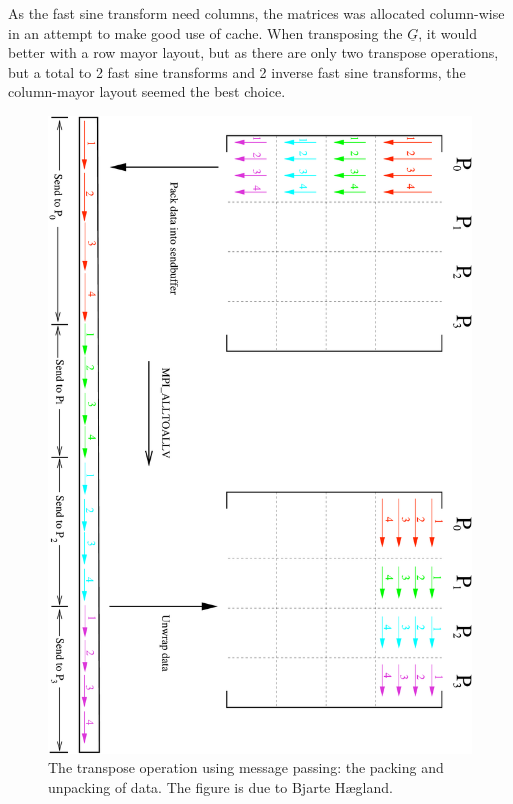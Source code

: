 As the fast sine transform need columns, the matrices was allocated column-wise in an attempt to make good use of cache. When transposing the $\underline{G}$, it would better with a row mayor layout, but as there are only two transpose operations, but a total to 2 fast sine transforms and 2 inverse fast sine transforms, the column-mayor layout seemed the best choice. \\
%
\begin{figure}[h!]
\begin{center}
    \includegraphics[angle=90,scale=0.35]{./Figures/matrix_blocktranspose.pdf}
\end{center}
\caption{The transpose operation using message passing: the packing and unpacking of data. The figure is due to Bjarte Hægland.}
\label{fig:mpisend}
\end{figure}
